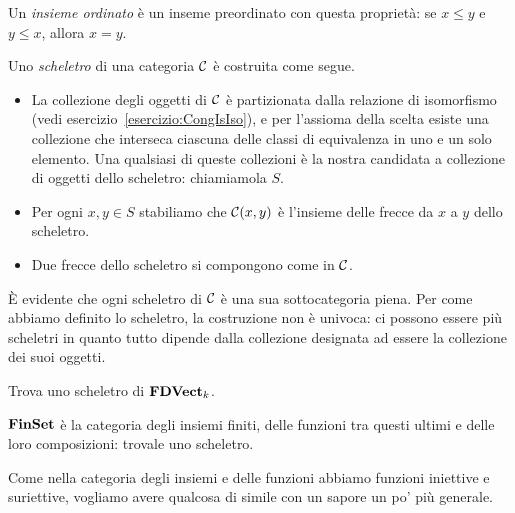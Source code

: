 \begin{esempio}
Un {\em insieme ordinato} è un inseme preordinato con questa proprietà: se \(x \leqslant y\) e \(y \leqslant x\), allora \(x = y\).
\end{esempio}

\begin{costruzione}
Uno {\em scheletro} di una categoria \(\mathcal C\) è costruita come segue.
\begin{itemize}
\item La collezione degli oggetti di \(\mathcal C\) è partizionata dalla relazione di isomorfismo (vedi esercizio~\ref{esercizio:CongIsIso}), e per l'assioma della scelta esiste una collezione che interseca ciascuna delle classi di equivalenza in uno e un solo elemento. Una qualsiasi di queste collezioni è la nostra candidata a collezione di oggetti dello scheletro: chiamiamola \(S\).
\item Per ogni \(x, y \in S\) stabiliamo che \(\mathcal C(x, y)\) è l'insieme delle frecce da \(x\) a \(y\) dello scheletro.
\item Due frecce dello scheletro si compongono come in \(\mathcal C\).%
\end{itemize}
È evidente che ogni scheletro di \(\mathcal C\) è una sua sottocategoria piena.\newline
Per come abbiamo definito lo scheletro, la costruzione non è univoca: ci possono essere più scheletri in quanto tutto dipende dalla collezione designata ad essere la collezione dei suoi oggetti.
\end{costruzione}

\begin{esercizio}
Trova uno scheletro di \(\mathbf{FDVect}_k\).
\end{esercizio}

\begin{esercizio}
\(\mathbf{FinSet}\) è la categoria degli insiemi finiti, delle funzioni tra questi ultimi e delle loro composizioni: trovale uno scheletro.
\end{esercizio}

Come nella categoria degli insiemi e delle funzioni abbiamo funzioni iniettive e suriettive, vogliamo avere qualcosa di simile con un sapore un po' più generale.


